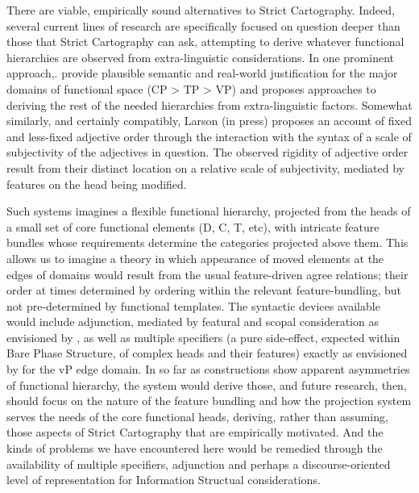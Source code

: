 \documentclass[output=paper]{langscibook}
\begin{document}
There are viable, empirically sound alternatives to Strict Cartography. Indeed, several current lines of research are specifically focused on question deeper than those that Strict Cartography can ask, attempting to derive whatever functional hierarchies are observed from extra-linguistic considerations. In one prominent approach,. \citealt{ramchand2014deriving} provide plausible semantic and real-world justification for the major domains of functional space (CP > TP > VP) and proposes approaches to deriving the rest of the needed hierarchies from extra-linguistic factors. Somewhat similarly, and certainly compatibly, Larson (in press) proposes an account of fixed and less-fixed adjective order through the interaction with the syntax of a scale of subjectivity of the adjectives in question. The observed rigidity of adjective order result from their distinct location on a relative scale of subjectivity, mediated by features on the head being modified.

\begin{sloppypar}
Such systems imagines a flexible functional hierarchy, projected from the heads of a small set of core functional elements (D, C, T, etc), with intricate feature bundles whose requirements determine the categories projected above them. This allows us to imagine a theory in which appearance of moved elements at the edges of domains would result from the usual feature-driven agree relations; their order at times determined by ordering within the relevant feature-bundling, but not pre-determined by functional templates. The syntactic devices available would include adjunction, mediated by featural and scopal consideration as envisioned by \citet{Ernst2007}, as well as multiple specifiers (a pure side-effect, expected within Bare Phase Structure,  of complex heads and their features) exactly as envisioned by \citealt{Chomsky2001} for the vP edge domain. In so far as constructions show apparent asymmetries of functional hierarchy, the system would derive those, and future research, then, should focus on the nature of the feature bundling and how the projection system serves the needs of the core functional heads, deriving, rather than assuming, those aspects of Strict Cartography that are empirically motivated. And the kinds of problems we have encountered here would be remedied through the availability of multiple specifiers, adjunction and perhaps a discourse-oriented level of representation for Information Structual considerations. 
\end{sloppypar}
	
\end{document}

